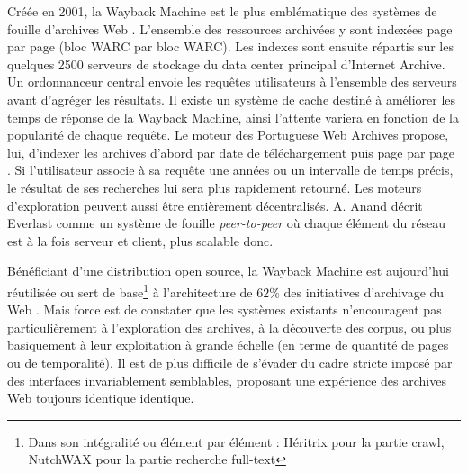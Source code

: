 \documentclass[symmetric,justified,marginals=raggedouter]{tufte-book}
\begin{document}
Créée en 2001, la Wayback Machine est le plus emblématique des systèmes de fouille d'archives Web \citep{tofel_waybackfor_2007}. L'ensemble des re\-ssources archivées y sont indexées page par page (bloc WARC par bloc WARC). Les indexes sont ensuite répartis sur les quelques 2500 serveurs de stockage du data center principal d'Internet Archive. Un ordonnanceur central envoie les requêtes utilisateurs à l'ensemble des serveurs avant d'agréger les résultats. Il existe un système de cache destiné à améliorer les temps de réponse de la Wayback Machine, ainsi l'attente variera en fonction de la popularité de chaque requête. Le moteur des Portuguese Web Archives propose, lui, d'indexer les archives d'abord par date de téléchargement puis page par page \citep{costa_survey_2013}. Si l'utilisateur associe à sa requête une années ou un intervalle de temps précis, le résultat de ses recherches lui sera plus rapidement retourné. Les moteurs d'exploration peuvent aussi être entièrement décentralisés. A. Anand décrit Everlast \citep{anand_everlast:_2009} comme un système de fouille \textit{peer-to-peer} où chaque élément du réseau est à la fois serveur et client, plus scalable donc. 

Bénéficiant d'une distribution open source, la Wayback Machine est aujourd'hui réutilisée ou sert de base\footnote{Dans son intégralité ou élément par élément : Héritrix pour la partie crawl, NutchWAX pour la partie recherche full-text} à l'architecture de $62\%$ des initiatives d'archivage du Web \citep{costa_survey_2013}. Mais force est de constater que les systèmes existants n'encouragent pas particulièrement à l'exploration des archives, à la découverte des corpus, ou plus basiquement à leur exploitation à grande échelle (en terme de quantité de pages ou de temporalité). Il est de plus difficile de s'évader du cadre stricte imposé par des interfaces invariablement semblables, proposant une expérience des archives Web toujours identique identique.
\end{document}
